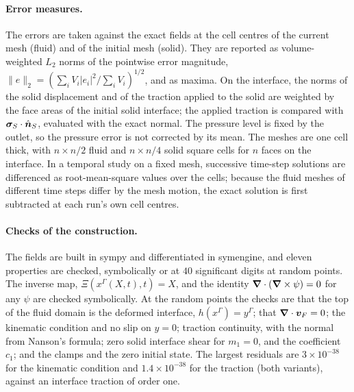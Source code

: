 \paragraph{Error measures.}
The errors are taken against the exact fields at the cell centres of the current mesh (fluid) and of the initial mesh (solid).
They are reported as volume-weighted $L_2$ norms of the pointwise error magnitude, $\|e\|_2 = (\sum_i V_i |e_i|^2/\sum_i V_i)^{1/2}$, and as maxima.
On the interface, the norms of the solid displacement and of the traction applied to the solid are weighted by the face areas of the initial solid interface; the applied traction is compared with $\boldsymbol{\sigma}_S\cdot\hat{\boldsymbol{n}}_S$, evaluated with the exact normal.
The pressure level is fixed by the outlet, so the pressure error is not corrected by its mean.
The meshes are one cell thick, with $n \times n/2$ fluid and $n \times n/4$ solid square cells for $n$ faces on the interface.
In a temporal study on a fixed mesh, successive time-step solutions are differenced as root-mean-square values over the cells; because the fluid meshes of different time steps differ by the mesh motion, the exact solution is first subtracted at each run's own cell centres.

\paragraph{Checks of the construction.}
The fields are built in sympy and differentiated in symengine, and eleven properties are checked, symbolically or at $40$ significant digits at random points.
The inverse map, $\Xi(x^\Gamma(X,t),t) = X$, and the identity $\boldsymbol{\nabla}\cdot(\boldsymbol{\nabla}\times\psi) = 0$ for any $\psi$ are checked symbolically.
At the random points the checks are that the top of the fluid domain is the deformed interface, $h(x^\Gamma) = y^\Gamma$; that $\boldsymbol{\nabla}\cdot\boldsymbol{v}_F = 0$; the kinematic condition and no slip on $y = 0$; traction continuity, with the normal from Nanson's formula; zero solid interface shear for $m_1 = 0$, and the coefficient $c_1$; and the clamps and the zero initial state.
The largest residuals are $3\times10^{-38}$ for the kinematic condition and $1.4\times10^{-38}$ for the traction (both variants), against an interface traction of order one.

